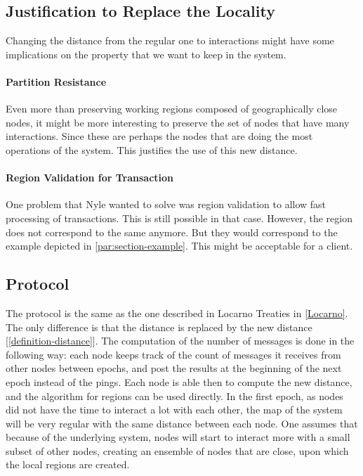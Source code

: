 \documentclass[a4paper,11pt,twoside=semi,openright]{report}
\begin{document}
\subsection{Justification to Replace the Locality}
Changing the distance from the regular one to interactions might have some
implications on the property that we want to keep in the system. 

\paragraph{Partition Resistance}
Even more than preserving working regions
composed of geographically close nodes, it might be more interesting to preserve
the set of nodes that have many interactions. Since these are perhaps the nodes that are doing the most operations of the system. This justifies the use of
this new distance.

\paragraph{Region Validation for Transaction}
One problem that Nyle wanted to solve was region validation to allow fast
processing of transactions. This is still possible in that case. However, the
region does not correspond to the same anymore. But they would correspond to
the example depicted in \autoref{par:section-example}. This might be acceptable
for a client. 

\subsection{Protocol}
The protocol is the same as the one described in Locarno Treaties in
\autoref{Locarno}. The only difference is that the distance is replaced by the
new distance [\autoref{definition-distance}]. The computation of the number of
messages is done in the following way: each node keeps track of the count
of messages it receives from other nodes between epochs, and post the results
at the beginning of the next epoch instead of the pings. Each node is able then
to compute the new distance, and the algorithm for regions can be used
directly. In the first epoch, as nodes did not have the time to interact a lot
with each other, the map of the system will be very regular with the same distance between each node. One assumes that because of the underlying system, nodes will start to interact more with a small subset of other nodes, creating an ensemble of nodes that are close, upon which the local regions are created.
\end{document}
